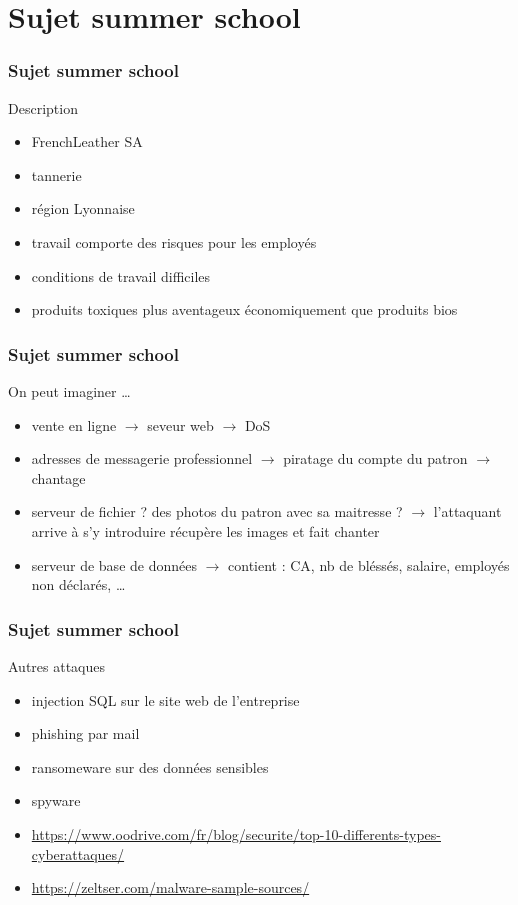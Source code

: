 \documentclass{beamer}
\begin{document}
		\section{Sujet summer school}
		\begin{frame}
			\frametitle{Sujet summer school}
			\begin{block}{Description}
				\begin{itemize}
					\item FrenchLeather SA
					\item tannerie
					\item région Lyonnaise
					\item travail comporte des risques pour les employés
					\item conditions de travail difficiles
					\item produits toxiques plus aventageux économiquement que produits bios
				\end{itemize}
			\end{block}
		\end{frame}
		\begin{frame}
			\frametitle{Sujet summer school}
			\begin{block}{On peut imaginer \ldots}
				\begin{itemize}
					\item vente en ligne $\rightarrow$ seveur web $\rightarrow$ DoS
					\item adresses de messagerie professionnel $\rightarrow$ piratage du compte du patron $\rightarrow$ chantage
					\item serveur de fichier ? des photos du patron avec sa maitresse ? $\rightarrow$ l'attaquant arrive à s'y introduire récupère les images et fait chanter
					\item serveur de base de données $\rightarrow$ contient : CA, nb de bléssés, salaire, employés non déclarés, \ldots
				\end{itemize}
			\end{block}
		\end{frame}
		\begin{frame}
			\frametitle{Sujet summer school}
			\begin{block}{Autres attaques}
				\begin{itemize}
					\item injection SQL sur le site web de l'entreprise
					\item phishing par mail
					\item ransomeware sur des données sensibles
					\item spyware
				\end{itemize}
			\end{block}
		\end{frame}
	\begin{frame}
		\begin{itemize}
			\item \url{https://www.oodrive.com/fr/blog/securite/top-10-differents-types-cyberattaques/}
			\item \url{https://zeltser.com/malware-sample-sources/}
		\end{itemize}
	\end{frame}
\end{document}
